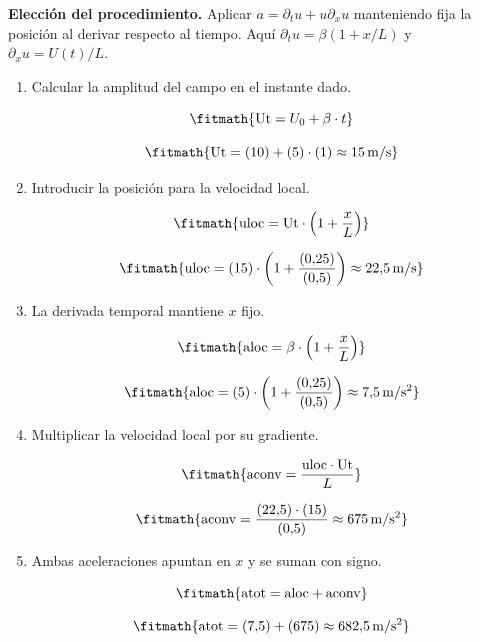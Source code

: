 \noindent\textbf{Elección del procedimiento.} Aplicar $a=\partial_tu+u\partial_xu$ manteniendo fija la posición al derivar respecto al tiempo. Aquí $\partial_tu=\beta(1+x/L)$ y $\partial_xu=U(t)/L$.

\begin{enumerate}

\item Calcular la amplitud del campo en el instante dado.

\[\fitmath{\mathrm{Ut}=U_{0}+\beta\cdot t}\]

\[\fitmath{\mathrm{Ut}=(10)+(5)\cdot (1)\approx 15\,\mathrm{m/s}}\]

\item Introducir la posición para la velocidad local.

\[\fitmath{\mathrm{uloc}=\mathrm{Ut}\cdot \left(1+\frac{x}{L}\right)}\]

\[\fitmath{\mathrm{uloc}=(15)\cdot \left(1+\frac{(0{,}25)}{(0{,}5)}\right)\approx 22{,}5\,\mathrm{m/s}}\]

\item La derivada temporal mantiene $x$ fijo.

\[\fitmath{\mathrm{aloc}=\beta\cdot \left(1+\frac{x}{L}\right)}\]

\[\fitmath{\mathrm{aloc}=(5)\cdot \left(1+\frac{(0{,}25)}{(0{,}5)}\right)\approx 7{,}5\,\mathrm{m/s^{2}}}\]

\item Multiplicar la velocidad local por su gradiente.

\[\fitmath{\mathrm{aconv}=\frac{\mathrm{uloc}\cdot \mathrm{Ut}}{L}}\]

\[\fitmath{\mathrm{aconv}=\frac{(22{,}5)\cdot (15)}{(0{,}5)}\approx 675\,\mathrm{m/s^{2}}}\]

\item Ambas aceleraciones apuntan en $x$ y se suman con signo.

\[\fitmath{\mathrm{atot}=\mathrm{aloc}+\mathrm{aconv}}\]

\[\fitmath{\mathrm{atot}=(7{,}5)+(675)\approx 682{,}5\,\mathrm{m/s^{2}}}\]

\end{enumerate}
